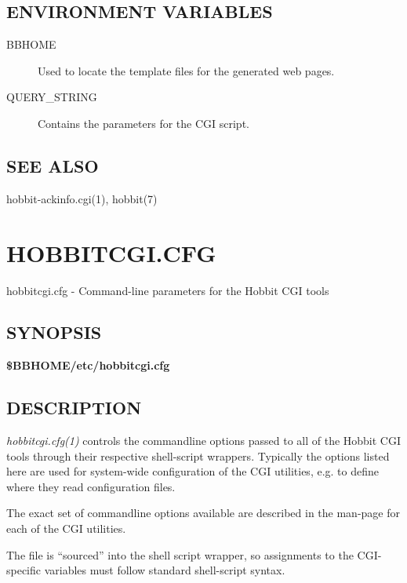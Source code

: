 \subsection{ENVIRONMENT VARIABLES}
\begin{description}
\item[BBHOME] Used to locate the template files for the generated web pages. 

 

\item[QUERY\_STRING] Contains the parameters for the CGI script. 


\end{description}
\subsection{SEE ALSO}
hobbit-ackinfo.cgi(1), hobbit(7) 

%
%
\newpage
\section{HOBBITCGI.CFG}
 hobbitcgi.cfg - Command-line parameters for the Hobbit CGI tools 

 
\subsection{SYNOPSIS}
\textbf{\$BBHOME/etc/hobbitcgi.cfg}


 
\subsection{DESCRIPTION}
\emph{hobbitcgi.cfg(1)}
 controls the commandline options passed to all of the Hobbit CGI tools through their respective shell-script wrappers. Typically the options listed here are used for system-wide configuration of the CGI utilities, e.g. to define where they read configuration files. 

  The exact set of commandline options available are described in the man-page for each of the CGI utilities. 


  The file is ``sourced'' into the shell script wrapper, so assignments to the CGI-specific variables must follow standard shell-script syntax. 


